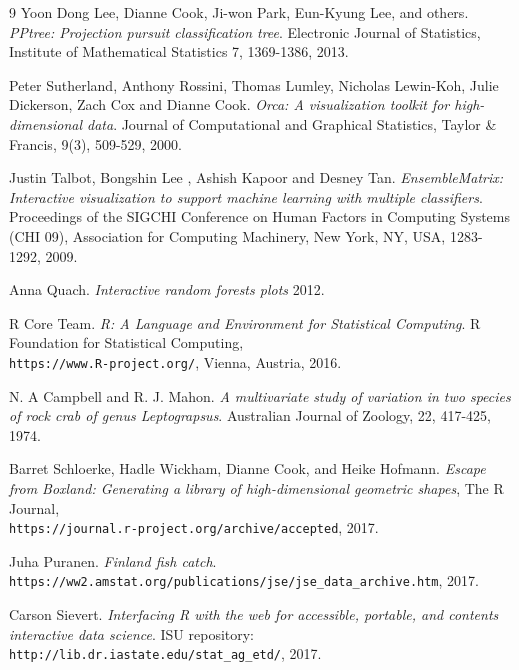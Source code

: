 \documentclass[10pt, legalpaper, twoside]{article}\usepackage[]{graphicx}\usepackage[]{color}
\begin{document}
\begin{thebibliography}{9}
Yoon Dong Lee, Dianne  Cook, Ji-won  Park, Eun-Kyung Lee,  and others.
\textit{PPtree: Projection pursuit classification tree}.
Electronic Journal of Statistics, Institute of Mathematical Statistics
7, 1369-1386, 2013.

Peter Sutherland, Anthony Rossini, Thomas Lumley,  Nicholas  Lewin-Koh, Julie  Dickerson, Zach Cox and Dianne Cook.
 \textit{Orca: A visualization toolkit for high-dimensional data}.
Journal of Computational and Graphical Statistics, Taylor \& Francis, 9(3), 509-529, 2000.



Justin Talbot, Bongshin Lee , Ashish Kapoor and Desney Tan.
\textit{EnsembleMatrix: Interactive visualization to support machine learning with multiple classifiers}.
Proceedings of the SIGCHI Conference on Human Factors in Computing Systems (CHI 09),
Association for Computing Machinery,
New York, NY, USA, 1283-1292, 2009.

Anna Quach.
\textit{Interactive random forests plots}
2012.

R Core Team.
\textit{R: A Language and Environment for Statistical Computing}.
R Foundation for Statistical Computing,
\\\texttt{https://www.R-project.org/},
Vienna, Austria, 2016.

N. A Campbell and  R. J. Mahon.
\textit{A multivariate study of variation in two species of rock crab of genus Leptograpsus}.
Australian Journal of Zoology, 22, 417-425, 1974.


Barret Schloerke, Hadle Wickham, Dianne Cook,  and Heike Hofmann.
\textit{Escape from Boxland: Generating a library of high-dimensional geometric shapes},
The R Journal,\\\texttt{https://journal.r-project.org/archive/accepted}, 2017.

  Juha Puranen.
 \textit{Finland fish catch}.
 \\\texttt{https://ww2.amstat.org/publications/jse/jse\_data\_archive.htm}, 2017.



Carson Sievert.
\textit{Interfacing R with the web for accessible, portable, and
contents interactive data science}.
ISU repository: \\\texttt{http://lib.dr.iastate.edu/stat\_ag\_etd/}, 2017.



\end{thebibliography}
\end{document}

